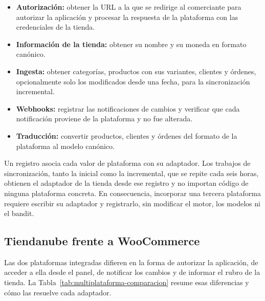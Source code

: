 \begin{itemize}
    \item \textbf{Autorización:} obtener la URL a la que se redirige al comerciante para autorizar la aplicación y procesar la respuesta de la plataforma con las credenciales de la tienda.
    \item \textbf{Información de la tienda:} obtener su nombre y su moneda en formato canónico.
    \item \textbf{Ingesta:} obtener categorías, productos con sus variantes, clientes y órdenes, opcionalmente solo los modificados desde una fecha, para la sincronización incremental.
    \item \textbf{Webhooks:} registrar las notificaciones de cambios y verificar que cada notificación proviene de la plataforma y no fue alterada.
    \item \textbf{Traducción:} convertir productos, clientes y órdenes del formato de la plataforma al modelo canónico.
\end{itemize}

Un registro asocia cada valor de plataforma con su adaptador. Los trabajos de sincronización, tanto la inicial como la incremental, que se repite cada seis horas, obtienen el adaptador de la tienda desde ese registro y no importan código de ninguna plataforma concreta. En consecuencia, incorporar una tercera plataforma requiere escribir su adaptador y registrarlo, sin modificar el motor, los modelos ni el bandit.

\subsection{Tiendanube frente a WooCommerce}
\label{sec:multiplataforma-comparacion}

Las dos plataformas integradas difieren en la forma de autorizar la aplicación, de acceder a ella desde el panel, de notificar los cambios y de informar el rubro de la tienda. La Tabla~\ref{tab:multiplataforma-comparacion} resume esas diferencias y cómo las resuelve cada adaptador.

